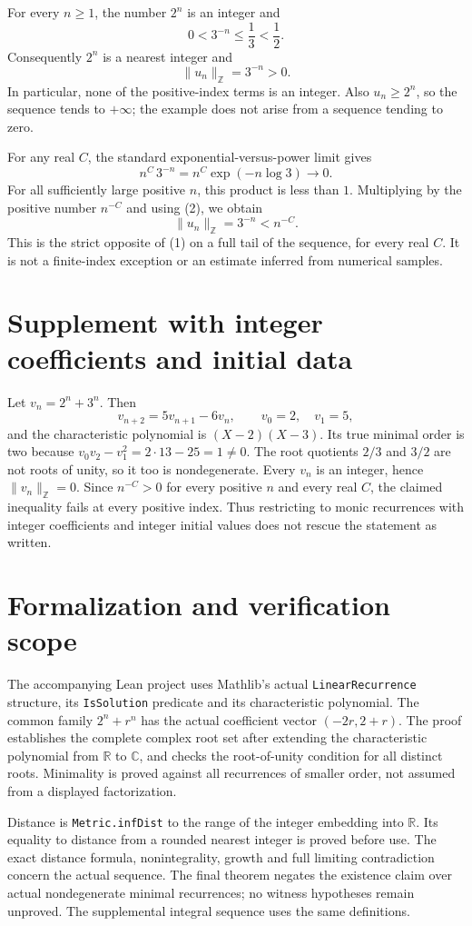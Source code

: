 \documentclass[10pt]{article}
\newcommand{\Z}{\mathbb Z}
\newcommand{\R}{\mathbb R}
\newcommand{\C}{\mathbb C}
\newcommand{\distZ}[1]{\lVert #1\rVert_{\Z}}
\begin{document}
For every $n\ge1$, the number $2^n$ is an integer and
\[
 0<3^{-n}\le\frac13<\frac12.
\]
Consequently $2^n$ is a nearest integer and
\[
 \distZ{u_n}=3^{-n}>0. \tag{2}
\]
In particular, none of the positive-index terms is an integer. Also $u_n\ge2^n$, so the sequence tends to $+\infty$; the example does not arise from a sequence tending to zero.

For any real $C$, the standard exponential-versus-power limit gives
\[
 n^C\,3^{-n}=n^C\exp(-n\log3)\longrightarrow0.
\]
For all sufficiently large positive $n$, this product is less than $1$. Multiplying by the positive number $n^{-C}$ and using (2), we obtain
\[
 \distZ{u_n}=3^{-n}<n^{-C}.
\]
This is the strict opposite of (1) on a full tail of the sequence, for every real $C$. It is not a finite-index exception or an estimate inferred from numerical samples.

\section{Supplement with integer coefficients and initial data}
Let $v_n=2^n+3^n$. Then
\[
 v_{n+2}=5v_{n+1}-6v_n,\qquad v_0=2,\quad v_1=5,
\]
and the characteristic polynomial is $(X-2)(X-3)$. Its true minimal order is two because $v_0v_2-v_1^2=2\cdot13-25=1\ne0$. The root quotients $2/3$ and $3/2$ are not roots of unity, so it too is nondegenerate. Every $v_n$ is an integer, hence $\distZ{v_n}=0$. Since $n^{-C}>0$ for every positive $n$ and every real $C$, the claimed inequality fails at every positive index. Thus restricting to monic recurrences with integer coefficients and integer initial values does not rescue the statement as written.

\section{Formalization and verification scope}
The accompanying Lean project uses Mathlib's actual \texttt{LinearRecurrence} structure, its \texttt{IsSolution} predicate and its characteristic polynomial. The common family $2^n+r^n$ has the actual coefficient vector $(-2r,2+r)$. The proof establishes the complete complex root set after extending the characteristic polynomial from $\R$ to $\C$, and checks the root-of-unity condition for all distinct roots. Minimality is proved against all recurrences of smaller order, not assumed from a displayed factorization.

Distance is \texttt{Metric.infDist} to the range of the integer embedding into $\R$. Its equality to distance from a rounded nearest integer is proved before use. The exact distance formula, nonintegrality, growth and full limiting contradiction concern the actual sequence. The final theorem negates the existence claim over actual nondegenerate minimal recurrences; no witness hypotheses remain unproved. The supplemental integral sequence uses the same definitions.
\end{document}
